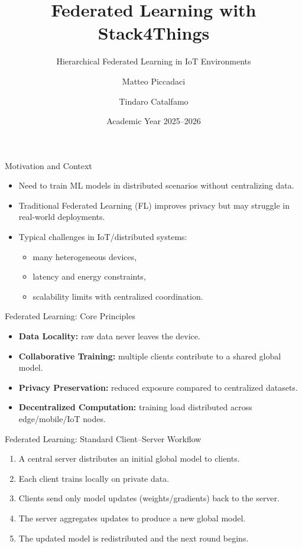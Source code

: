 \documentclass[aspectratio=169]{beamer}
\title[Federated Learning with S4T]{Federated Learning with Stack4Things}
\subtitle{Hierarchical Federated Learning in IoT Environments}
\author{Matteo Piccadaci \and Tindaro Catalfamo}
\date{Academic Year 2025--2026}
\begin{document}
\begin{frame}
  \titlepage 
\end{frame}

\begin{frame}{Motivation and Context}
\begin{itemize}
  \item Need to train ML models in distributed scenarios without centralizing data.
  \item Traditional Federated Learning (FL) improves privacy but may struggle in real-world deployments.
  \item Typical challenges in IoT/distributed systems:
  \begin{itemize}
    \item many heterogeneous devices,
    \item latency and energy constraints,
    \item scalability limits with centralized coordination.
  \end{itemize}
\end{itemize}
\end{frame}

\begin{frame}{Federated Learning: Core Principles}
\begin{itemize}
  \item \textbf{Data Locality:} raw data never leaves the device.
  \item \textbf{Collaborative Training:} multiple clients contribute to a shared global model.
  \item \textbf{Privacy Preservation:} reduced exposure compared to centralized datasets.
  \item \textbf{Decentralized Computation:} training load distributed across edge/mobile/IoT nodes.
\end{itemize}
\end{frame}

\begin{frame}{Federated Learning: Standard Client--Server Workflow}
\begin{enumerate}
  \item A central server distributes an initial global model to clients.
  \item Each client trains locally on private data.
  \item Clients send only model updates (weights/gradients) back to the server.
  \item The server aggregates updates to produce a new global model.
  \item The updated model is redistributed and the next round begins.
\end{enumerate}
\end{frame}
\end{document}
